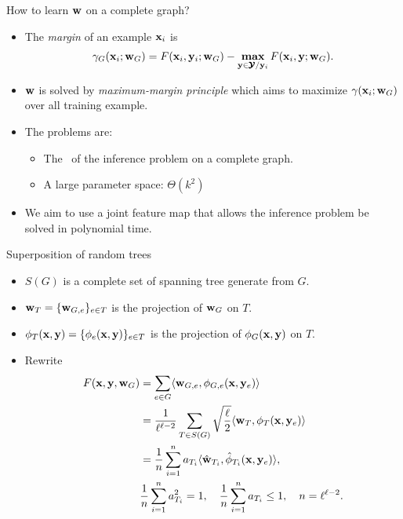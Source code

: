 \documentclass[first=dgreen,second=purple,logo=yellowexc]{aaltoslides}
\begin{document}
%
\begin{frame}{How to learn $\mathbf {w}$ on a complete graph?}
	\begin{itemize}
		\item The \textit{margin} of an example $\mathbf {x}_i$ is
		\begin{align*}
			\gamma_G(\mathbf {x}_i;\mathbf {w}_G) = F(\mathbf {x}_i,\mathbf {y}_i;\mathbf {w}_G) - \underset{\mathbf {y}\in\pmb {\mathcal{Y}}/\mathbf {y}_i}{\textbf{max}}\,F(\mathbf {x}_i,\mathbf {y};\mathbf {w}_G).
		\end{align*}
		\item $\mathbf {w}$ is solved by \textit{maximum-margin principle} which aims to maximize $\gamma(\mathbf {x}_i;\mathbf {w}_G)$ over all training example.
		\item The problems are:
		\begin{itemize}
			\item The \nphardness\ of the inference problem on a complete graph.
			\item A large parameter space: $\Theta(k^2)$
		\end{itemize}
		\item We aim to use a joint feature map that allows the inference problem be solved in polynomial time.
	\end{itemize}
\end{frame}



%
\begin{frame}{Superposition of random trees}
	\begin{itemize}
		\item $S(G)$ is a complete set of spanning tree generate from $G$.
		\item $\mathbf {w}_{T}=\{\mathbf {w}_{G,e}\}_{e\in T}$ is the projection of $\mathbf {w}_G$ on $T$.
		\item $\phi_T(\mathbf {x},\mathbf {y})=\{\phi_e(\mathbf {x},\mathbf {y})\}_{e\in T}$ is the projection of $\phi_G(\mathbf {x},\mathbf {y})$ on $T$.
		\item Rewrite
		\begin{align*}
			F(\mathbf {x},\mathbf {y},\mathbf {w}_G) &= \sum_{e\in G}\langle \mathbf {w}_{G,e}, \phi_{G,e}(\mathbf {x},\mathbf {y}_e) \rangle \\
			& = \frac{1}{\ell^{\ell-2}}\sum_{T\in S(G)}\sqrt{\frac{\ell}{2}}\langle \mathbf {w}_{T}, \phi_{T}(\mathbf {x},\mathbf {y}_e) \rangle\\
			& = \frac{1}{n}\sum_{i = 1}^{n}a_{T_i}\langle \hat{\mathbf {w}}_{T_i}, \hat{\phi}_{T_i}(\mathbf {x},\mathbf {y}_e) \rangle,\\
			& \frac{1}{n}\sum_{i = 1}^{n}a_{T_i}^2=1, \quad 	\frac{1}{n}\sum_{i = 1}^{n}a_{T_i}\le1, \quad n=\ell^{\ell-2}.
		\end{align*}
	\end{itemize}
\end{frame}
\end{document}
